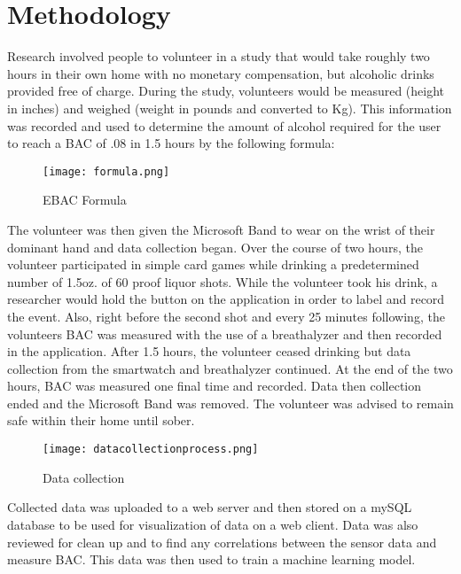 \section{Methodology}
Research involved people to volunteer in a study that would take roughly two hours in their own home with no monetary compensation, but alcoholic drinks provided free of charge. During the study, volunteers would be measured (height in inches) and weighed (weight in pounds and converted to Kg). This information was recorded and used to determine the amount of alcohol required for the user to reach a BAC of .08 in 1.5 hours by the following formula:

\begin{figure}[H]
	\centering
	\texttt{[image: formula.png]}
	\caption{EBAC Formula}
\end{figure}

The volunteer was then given the Microsoft Band to wear on the wrist of their dominant hand and data collection began. Over the course of two hours, the volunteer participated in simple card games while drinking a predetermined number of 1.5oz. of 60 proof liquor shots. While the volunteer took his drink, a researcher would hold the button on the application in order to label and record the event. Also, right before the second shot and every 25 minutes following, the volunteers BAC was measured with the use of a breathalyzer and then recorded in the application. After 1.5 hours, the volunteer ceased drinking but data collection from the smartwatch and breathalyzer continued. At the end of the two hours, BAC was measured one final time and recorded. Data then collection ended and the Microsoft Band was removed. The volunteer was advised to remain safe within their home until sober. 

\begin{figure}[H]
	\centering
	\texttt{[image: datacollectionprocess.png]}
	\caption{Data collection}
\end{figure}

Collected data was uploaded to a web server and then stored on a mySQL database to be used for visualization of data on a web client. Data was also reviewed for clean up and to find any correlations between the sensor data and measure BAC. This data was then used to train a machine learning model. 